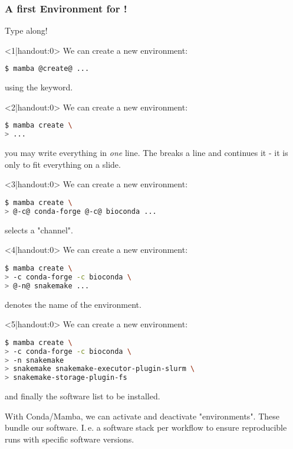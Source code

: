 \begin{frame}[fragile]
	\frametitle{A first Environment for \Snakemake!}
	\begin{task}
		Type along!
	\end{task}
    \begin{onlyenv}<1|handout:0>
      We can create a new environment:
      \begin{lstlisting}[language=Bash, style=Shell]
$ mamba @create@ ...
      \end{lstlisting}
      using the  keyword.
    \end{onlyenv}
    \begin{onlyenv}<2|handout:0>
    	We can create a new environment:
    	\begin{lstlisting}[language=Bash, style=Shell]
$ mamba create \
> ...
    	\end{lstlisting}
    	you may write everything in \emph{one} line. The \altverb{\\} breaks a line and \altverb{>} continues it - it is only to fit everything on a slide.
    \end{onlyenv}
    \begin{onlyenv}<3|handout:0>
    	We can create a new environment:
    	\begin{lstlisting}[language=Bash, style=Shell]
$ mamba create \
> @-c@ conda-forge @-c@ bioconda ...
    	\end{lstlisting}
    	 selects a "channel".
    \end{onlyenv}
    \begin{onlyenv}<4|handout:0>
    	We can create a new environment:
    	\begin{lstlisting}[language=Bash, style=Shell]
$ mamba create \
> -c conda-forge -c bioconda \
> @-n@ snakemake ...
    	\end{lstlisting}
    	 denotes the name of the environment.
    \end{onlyenv}
    \begin{onlyenv}<5|handout:0>
    	We can create a new environment:
    	\begin{lstlisting}[language=Bash, style=Shell]
$ mamba create \
> -c conda-forge -c bioconda \
> -n snakemake
> snakemake snakemake-executor-plugin-slurm \
> snakemake-storage-plugin-fs
    	\end{lstlisting}
    	and finally the software list to be installed.
    \end{onlyenv}
    \vfill
    \begin{docs}[What is an \emph{Environment}?]
    	With Conda/Mamba, we can activate and deactivate "environments". These bundle our software. I.\,e. a software stack per workflow to ensure reproducible runs with specific software versions.
    \end{docs}
\end{frame}

